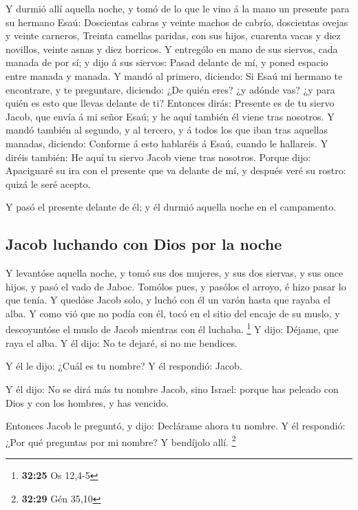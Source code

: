 Y durmió allí aquella noche, y tomó de lo que le vino á
la mano un presente para su hermano Esaú:  Doscientas
cabras y veinte machos de cabrío, doscientas ovejas y veinte carneros,
 Treinta camellas paridas, con sus hijos, cuarenta vacas
y diez novillos, veinte asnas y diez borricos.  Y
entrególo en mano de sus siervos, cada manada de por sí; y dijo á sus
siervos: Pasad delante de mí, y poned espacio entre manada y manada.
 Y mandó al primero, diciendo: Si Esaú mi hermano te
encontrare, y te preguntare, diciendo: ¿De quién eres? ¿y adónde vas? ¿y
para quién es esto que llevas delante de ti?  Entonces
dirás: Presente es de tu siervo Jacob, que envía á mi señor Esaú; y he
aquí también él viene tras nosotros.  Y mandó también al
segundo, y al tercero, y á todos los que iban tras aquellas manadas,
diciendo: Conforme á esto hablaréis á Esaú, cuando le hallareis.
 Y diréis también: He aquí tu siervo Jacob viene tras
nosotros. Porque dijo: Apaciguaré su ira con el presente que va delante
de mí, y después veré su rostro: quizá le seré acepto.

 Y pasó el presente delante de él; y él durmió aquella
noche en el campamento.

\hypertarget{jacob-luchando-con-dios-por-la-noche}{%
\subsection{Jacob luchando con Dios por la
noche}\label{jacob-luchando-con-dios-por-la-noche}}

 Y levantóse aquella noche, y tomó sus dos mujeres, y sus
dos siervas, y sus once hijos, y pasó el vado de Jaboc. 
Tomólos pues, y pasólos el arroyo, é hizo pasar lo que tenía.
 Y quedóse Jacob solo, y luchó con él un varón hasta que
rayaba el alba.  Y como vió que no podía con él, tocó en
el sitio del encaje de su muslo, y descoyuntóse el muslo de Jacob
mientras con él luchaba. \footnote{\textbf{32:25} Os 12,4-5}
 Y dijo: Déjame, que raya el alba. Y él dijo: No te
dejaré, si no me bendices.

 Y él le dijo: ¿Cuál es tu nombre? Y él respondió: Jacob.

 Y él dijo: No se dirá más tu nombre Jacob, sino Israel:
porque has peleado con Dios y con los hombres, y has vencido.

 Entonces Jacob le preguntó, y dijo: Declárame ahora tu
nombre. Y él respondió: ¿Por qué preguntas por mi nombre? Y bendíjolo
allí. \footnote{\textbf{32:29} Gén 35,10}

